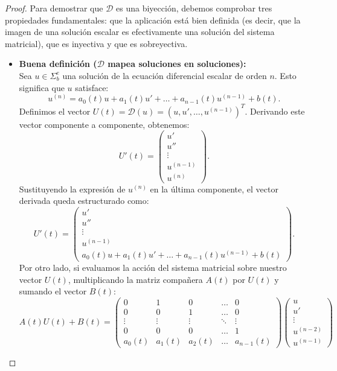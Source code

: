 \begin{proof}
    Para demostrar que $\mathcal{D}$ es una biyección, debemos comprobar tres propiedades fundamentales: que la aplicación está bien definida (es decir, que la imagen de una solución escalar es efectivamente una solución del sistema matricial), que es inyectiva y que es sobreyectiva.

    \begin{itemize}
        \item \textbf{Buena definición ($\mathcal{D}$ mapea soluciones en soluciones):} \\
        Sea $u \in \Sigma_b^e$ una solución de la ecuación diferencial escalar de orden $n$. Esto significa que $u$ satisface:
        \[
            u^{(n)} = a_0(t) u + a_1(t) u' + \dots + a_{n-1}(t) u^{(n-1)} + b(t).
        \]
        Definimos el vector $U(t) = \mathcal{D}(u) = (u, u', \dots, u^{(n-1)})^T$. Derivando este vector componente a componente, obtenemos:
        \[
            U'(t) = \begin{pmatrix} u' \\ u'' \\ \vdots \\ u^{(n-1)} \\ u^{(n)} \end{pmatrix}.
        \]
        Sustituyendo la expresión de $u^{(n)}$ en la última componente, el vector derivada queda estructurado como:
        \[
            U'(t) = \begin{pmatrix} u' \\ u'' \\ \vdots \\ u^{(n-1)} \\ a_0(t) u + a_1(t) u' + \dots + a_{n-1}(t) u^{(n-1)} + b(t) \end{pmatrix}.
        \]
        Por otro lado, si evaluamos la acción del sistema matricial sobre nuestro vector $U(t)$, multiplicando la matriz compañera $A(t)$ por $U(t)$ y sumando el vector $B(t)$:
        \[
            A(t) U(t) + B(t) = \begin{pmatrix} 
            0 & 1 & 0 & \dots & 0 \\
            0 & 0 & 1 & \dots & 0 \\
            \vdots & \vdots & \vdots & \ddots & \vdots \\
            0 & 0 & 0 & \dots & 1 \\
            a_0(t) & a_1(t) & a_2(t) & \dots & a_{n-1}(t)
            \end{pmatrix}
            \begin{pmatrix} u \\ u' \\ \vdots \\ u^{(n-2)} \\ u^{(n-1)} \end{pmatrix}
\]
\end{itemize}
\end{proof}
